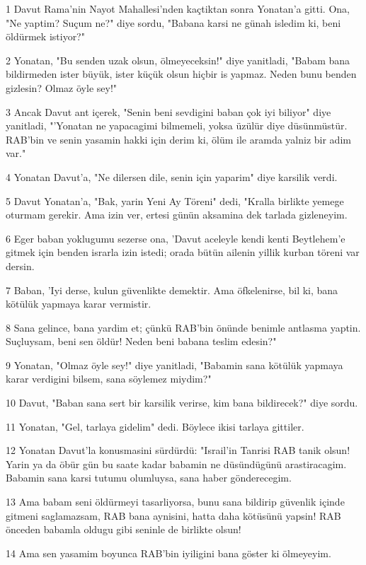 \par 1 Davut Rama'nin Nayot Mahallesi'nden kaçtiktan sonra Yonatan'a gitti. Ona, "Ne yaptim? Suçum ne?" diye sordu, "Babana karsi ne günah isledim ki, beni öldürmek istiyor?"
\par 2 Yonatan, "Bu senden uzak olsun, ölmeyeceksin!" diye yanitladi, "Babam bana bildirmeden ister büyük, ister küçük olsun hiçbir is yapmaz. Neden bunu benden gizlesin? Olmaz öyle sey!"
\par 3 Ancak Davut ant içerek, "Senin beni sevdigini baban çok iyi biliyor" diye yanitladi, "'Yonatan ne yapacagimi bilmemeli, yoksa üzülür diye düsünmüstür. RAB'bin ve senin yasamin hakki için derim ki, ölüm ile aramda yalniz bir adim var."
\par 4 Yonatan Davut'a, "Ne dilersen dile, senin için yaparim" diye karsilik verdi.
\par 5 Davut Yonatan'a, "Bak, yarin Yeni Ay Töreni" dedi, "Kralla birlikte yemege oturmam gerekir. Ama izin ver, ertesi günün aksamina dek tarlada gizleneyim.
\par 6 Eger baban yoklugumu sezerse ona, 'Davut aceleyle kendi kenti Beytlehem'e gitmek için benden israrla izin istedi; orada bütün ailenin yillik kurban töreni var dersin.
\par 7 Baban, 'Iyi derse, kulun güvenlikte demektir. Ama öfkelenirse, bil ki, bana kötülük yapmaya karar vermistir.
\par 8 Sana gelince, bana yardim et; çünkü RAB'bin önünde benimle antlasma yaptin. Suçluysam, beni sen öldür! Neden beni babana teslim edesin?"
\par 9 Yonatan, "Olmaz öyle sey!" diye yanitladi, "Babamin sana kötülük yapmaya karar verdigini bilsem, sana söylemez miydim?"
\par 10 Davut, "Baban sana sert bir karsilik verirse, kim bana bildirecek?" diye sordu.
\par 11 Yonatan, "Gel, tarlaya gidelim" dedi. Böylece ikisi tarlaya gittiler.
\par 12 Yonatan Davut'la konusmasini sürdürdü: "Israil'in Tanrisi RAB tanik olsun! Yarin ya da öbür gün bu saate kadar babamin ne düsündügünü arastiracagim. Babamin sana karsi tutumu olumluysa, sana haber gönderecegim.
\par 13 Ama babam seni öldürmeyi tasarliyorsa, bunu sana bildirip güvenlik içinde gitmeni saglamazsam, RAB bana aynisini, hatta daha kötüsünü yapsin! RAB önceden babamla oldugu gibi seninle de birlikte olsun!
\par 14 Ama sen yasamim boyunca RAB'bin iyiligini bana göster ki ölmeyeyim.
